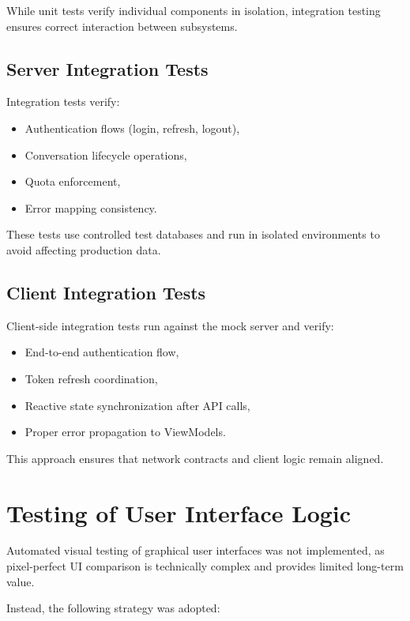 While unit tests verify individual components in isolation, integration testing ensures correct interaction between subsystems.

\subsection{Server Integration Tests}

Integration tests verify:

\begin{itemize}
    \item Authentication flows (login, refresh, logout),
    \item Conversation lifecycle operations,
    \item Quota enforcement,
    \item Error mapping consistency.
\end{itemize}

These tests use controlled test databases and run in isolated environments to avoid affecting production data.

\subsection{Client Integration Tests}

Client-side integration tests run against the mock server and verify:

\begin{itemize}
    \item End-to-end authentication flow,
    \item Token refresh coordination,
    \item Reactive state synchronization after API calls,
    \item Proper error propagation to ViewModels.
\end{itemize}

This approach ensures that network contracts and client logic remain aligned.

\section{Testing of User Interface Logic}

Automated visual testing of graphical user interfaces was not implemented, as pixel-perfect UI comparison is technically complex and provides limited long-term value.

Instead, the following strategy was adopted:

